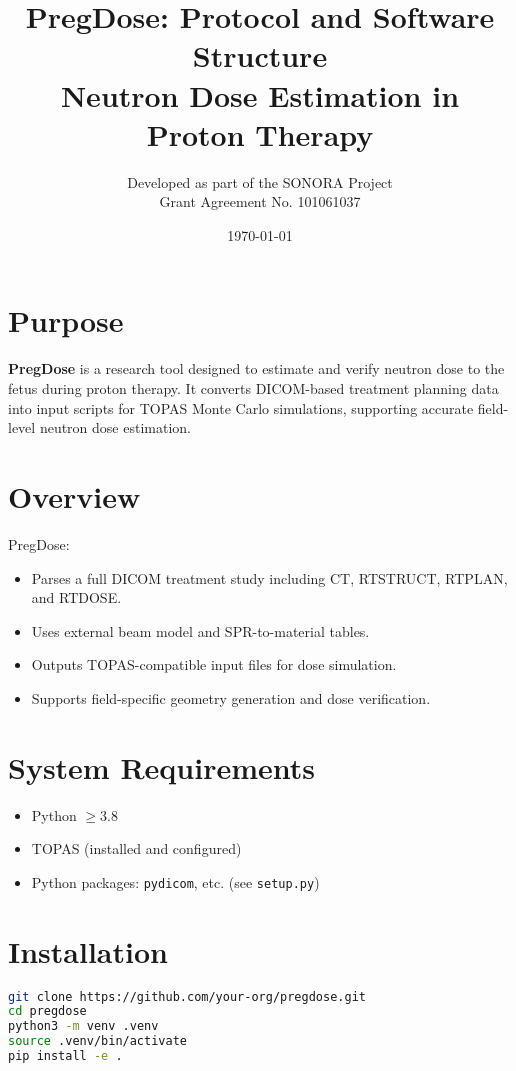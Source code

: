 \documentclass[11pt]{article}
\title{\textbf{PregDose: Protocol and Software Structure}\\Neutron Dose Estimation in Proton Therapy}
\author{Developed as part of the SONORA Project \\ Grant Agreement No. 101061037}
\date{\today}
\begin{document}
\maketitle

\section{Purpose}

\textbf{PregDose} is a research tool designed to estimate and verify neutron dose to the fetus during proton therapy. It converts DICOM-based treatment planning data into input scripts for TOPAS Monte Carlo simulations, supporting accurate field-level neutron dose estimation.

\section{Overview}

PregDose:
\begin{itemize}[topsep=0pt,itemsep=1pt]
    \item Parses a full DICOM treatment study including CT, RTSTRUCT, RTPLAN, and RTDOSE.
    \item Uses external beam model and SPR-to-material tables.
    \item Outputs TOPAS-compatible input files for dose simulation.
    \item Supports field-specific geometry generation and dose verification.
\end{itemize}

\section{System Requirements}
\begin{itemize}
    \item Python $\geq 3.8$
    \item TOPAS (installed and configured)
    \item Python packages: \texttt{pydicom}, etc. (see \texttt{setup.py})
\end{itemize}

\section{Installation}

\begin{lstlisting}[language=bash]
git clone https://github.com/your-org/pregdose.git
cd pregdose
python3 -m venv .venv
source .venv/bin/activate
pip install -e .
\end{lstlisting}
\end{document}

